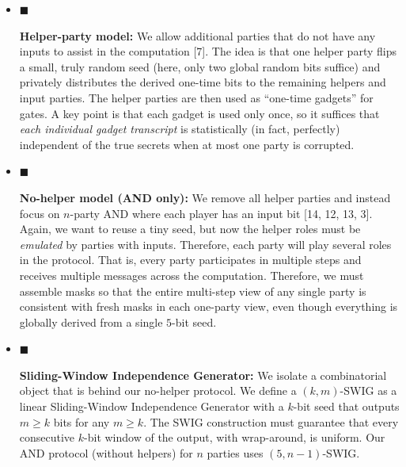 \documentclass[10pt,a4paper]{article}
\begin{document}
\begin{itemize}


\item[] 
$\blacksquare$ 


\textbf{Helper-party model:} We allow additional parties that do not have any inputs to assist in the computation [7]. The idea is that one helper party flips a small, truly random seed (here, only two global random bits suffice) and privately distributes the derived one-time bits to the remaining helpers and input parties. The helper parties are then used as “one-time gadgets” for gates. A key point is that each gadget is used only once, so it suffices that \emph{each individual gadget transcript} is statistically (in fact, perfectly) independent of the true secrets when at most one party is corrupted.\par





\item[] 
$\blacksquare$ 


\textbf{No-helper model (AND only):} We remove all helper parties and instead focus on $n$-party AND where each player has an input bit [14, 12, 13, 3]. Again, we want to reuse a tiny seed, but now the helper roles must be \emph{emulated} by parties with inputs. Therefore, each party will play several roles in the protocol. That is, every party participates in multiple steps and receives multiple messages across the computation. Therefore, we must assemble masks so that the entire multi-step view of any single party is consistent with fresh masks in each one-party view, even though everything is globally derived from a single $5$-bit seed.\par





\item[] 
$\blacksquare$ 


\textbf{Sliding-Window Independence Generator:} We isolate a combinatorial object that is behind our no-helper protocol. We define a $(k,m)$-SWIG as a linear Sliding-Window Independence Generator with a $k$-bit seed that outputs $m\geq k$ bits for any $m\geq k$. The SWIG construction must guarantee that every consecutive $k$-bit window of the output, with wrap-around, is uniform. Our AND protocol (without helpers) for $n$ parties uses $(5,n-1)$-SWIG.\par





\end{itemize}
\end{document}
